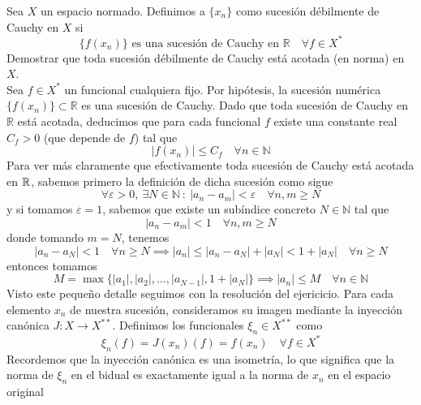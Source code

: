 \begin{ejercicio}
    Sea $X$ un espacio normado. Definimos a $\{x_n\}$ como sucesión débilmente de Cauchy en $X$ si 
    \begin{equation*}
        \{f(x_n)\} \text{ es una sucesión de Cauchy en } \mathbb{R} \quad \forall f \in X^* 
    \end{equation*}
    Demostrar que toda sucesión débilmente de Cauchy está acotada (en norma) en $X$. \\
    
    \noindent
    Sea $f \in X^*$ un funcional cualquiera fijo. Por hipótesis, la sucesión numérica $\{f(x_n)\} \subset \mathbb{R}$ es una sucesión de Cauchy. Dado que toda sucesión de Cauchy en $\mathbb{R}$ está acotada, deducimos que para cada funcional $f$ existe una constante real $C_f > 0$ (que depende de $f$) tal que
    \begin{equation}\label{eq:acotacion}
        |f(x_n)| \le C_f \quad \forall n \in \mathbb{N} 
    \end{equation}
    Para ver más claramente que efectivamente toda sucesión de Cauchy está acotada en $\mathbb{R}$, sabemos primero la definición de dicha sucesión como sigue
    \begin{equation*}
        \forall \varepsilon > 0, \ \exists N \in \mathbb{N} \ : \ |a_n - a_m| < \varepsilon \quad \forall n, m \ge N
    \end{equation*}
    y si tomamos $\varepsilon=1$, sabemos que existe un subíndice concreto $N \in \mathbb{N}$ tal que
    $$|a_n - a_m| < 1 \quad \forall n, m \ge N$$
    donde tomando $m=N$, tenemos
    \begin{equation*}
        |a_n - a_N| < 1 \quad \forall n \ge N \implies |a_n| \le |a_n - a_N| + |a_N| < 1 + |a_N| \quad \forall n \ge N
    \end{equation*}
    entonces tomamos
    \begin{equation*}
        M = \max\big\{ |a_1|, |a_2|, \dots, |a_{N-1}|, 1 + |a_N| \big\} \implies |a_n| \le M \quad \forall n \in \mathbb{N}
    \end{equation*}
    Visto este pequeño detalle seguimos con la resolución del ejericicio. Para cada elemento $x_n$ de nuestra sucesión, consideramos su imagen mediante la inyección canónica $J: X \to X^{**}$. Definimos los funcionales $\xi_n \in X^{**}$ como
    $$ \xi_n(f) = J(x_n)(f) = f(x_n) \quad \forall f \in X^* $$
    Recordemos que la inyección canónica es una isometría, lo que significa que la norma de $\xi_n$ en el bidual es exactamente igual a la norma de $x_n$ en el espacio original

\end{ejercicio}
